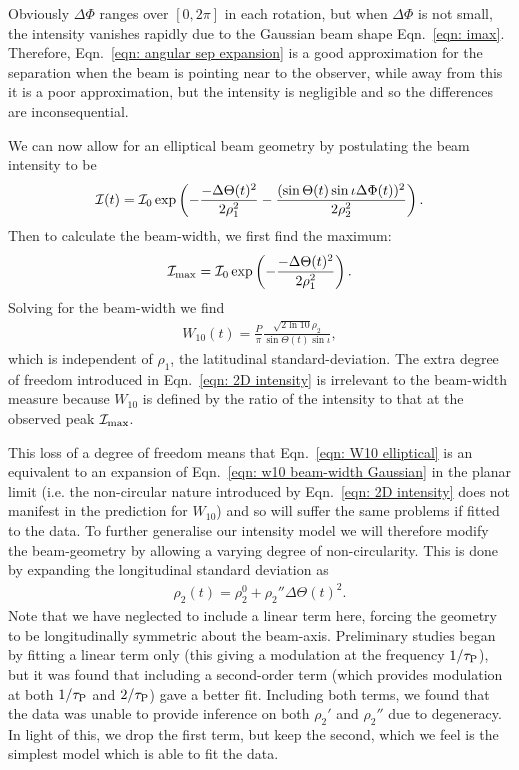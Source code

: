 \documentclass[../full_thesis/full_thesis.tex]{subfiles}
\begin{document}
Obviously $\Delta\Phi$ ranges over $[0,2\pi]$ in each rotation, but when
$\Delta\Phi$ is not small, the intensity vanishes rapidly due to the Gaussian
beam shape Eqn.~\eqref{eqn: imax}.  Therefore, Eqn.~\eqref{eqn: angular sep
expansion} is a good approximation for the separation when the beam is pointing
near to the observer, while away from this it is a poor approximation, but the
intensity is negligible and so the differences are inconsequential.

We can now allow for an elliptical beam geometry by postulating the beam
intensity to be
\begin{align}
\mathcal{I}(t) = \mathcal{I}_{0} \exp\left(
-\frac{-\Delta\Theta(t)^{2}}{2\rho_1^{2}}
-\frac{(\sin\Theta(t)\sin\iota\Delta\Phi(t))^{2}}{2\rho_2^{2}}
\right).
\label{eqn: 2D intensity}
\end{align}
Then to calculate the beam-width, we first find the maximum:
\begin{align}
\mathcal{I}_\textrm{max} = \mathcal{I}_{0} \exp\left(
-\frac{-\Delta\Theta(t)^{2}}{2\rho_1^{2}}
\right).
\end{align}
Solving for the beam-width we find
\begin{align}
W_{10}(t) = \frac{P}{\pi}\frac{\sqrt{2\ln10}\rho_{2}}{\sin\Theta(t)\sin\iota},
\label{eqn: W10 elliptical}
\end{align}
which is independent of $\rho_1$, the latitudinal standard-deviation. The extra
degree of freedom introduced in Eqn.~\eqref{eqn: 2D intensity} is irrelevant to
the beam-width measure because $W_{10}$ is defined by the ratio of the
intensity to that at the observed peak $\mathcal{I}_{\textrm{max}}$.

This loss of a degree of freedom means that Eqn.~\eqref{eqn: W10 elliptical} is
an equivalent to an expansion of Eqn.~\eqref{eqn: w10 beam-width Gaussian} in
the planar limit (i.e. the non-circular nature introduced by Eqn.~\eqref{eqn: 2D intensity}
does not manifest in the prediction for $W_{10}$)
and so will suffer the same problems if fitted to the data. To further
generalise our intensity model we will therefore modify the beam-geometry by
allowing a varying degree of  non-circularity. This is done by expanding the
longitudinal standard deviation as
\begin{align}
\rho_{2}(t) = \rho_2^{0} + \rho_2'' \Delta\Theta(t)^{2}.
\label{eqn: rho2}
\end{align}
Note that we have neglected to include a linear term here, forcing the geometry
to be longitudinally symmetric about the beam-axis. Preliminary studies began
by fitting a linear term only (this giving a modulation at the frequency
$1/\tau_{\mathrm{P}}$), but it was found that including a second-order term (which provides
modulation at both $1/\tau_{\mathrm{P}}$ and $2/\tau_{\mathrm{P}}$) gave a better fit. Including both
terms, we found that the data was unable to provide inference on both $\rho_2'$
and $\rho_2''$ due to degeneracy. In light of this, we drop the first
term, but keep the second, which we feel is the simplest model which is able to
fit the data.
\end{document}
